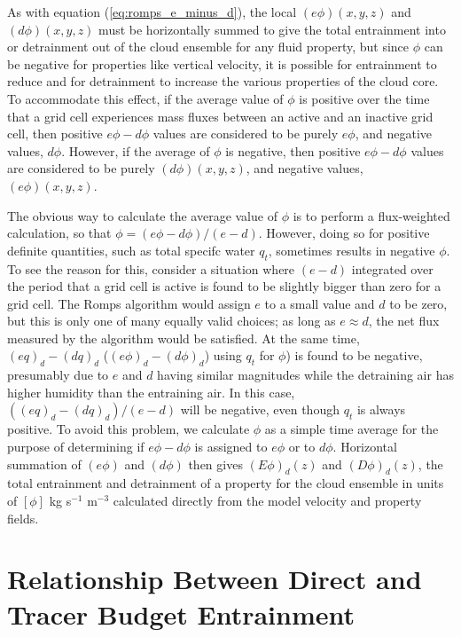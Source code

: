 \documentclass[12pt]{article}
\begin{document}
As with equation (\ref{eq:romps_e_minus_d}), the local $(e\phi)(x,y,z)$
and $(d\phi)(x,y,z)$ must be horizontally summed to give the total entrainment 
into or detrainment out of the cloud ensemble for any fluid property, but
since $\phi$ can be negative for properties like vertical velocity, it is 
possible for entrainment to reduce and for detrainment to increase the 
various properties of the cloud core.  To accommodate this effect, if the 
average value of $\phi$ is positive over the time that a grid cell experiences 
mass fluxes between an active and an inactive grid cell, then positive 
$e\phi-d\phi$ values are considered to be purely $e\phi$, and negative values, 
$d\phi$.  However, if the average of $\phi$ is negative, then positive 
$e\phi-d\phi$ values are considered to be purely $(d\phi)(x,y,z)$, and negative 
values, $(e\phi)(x,y,z)$.

The obvious way to calculate the average value of $\phi$ is to perform a 
flux-weighted calculation, so that $\phi = (e\phi - d\phi)/(e - d)$.  
However, doing so for positive definite quantities, such as total specifc 
water $q_t$, sometimes results in negative $\phi$.  To see the reason 
for this, consider a situation where $(e - d)$ integrated over the period 
that a grid cell is active is found to be slightly bigger than zero for 
a grid cell.  The Romps algorithm would assign $e$ to a small value and 
$d$ to be zero, but this is only one of many equally valid choices; as 
long as $e \approx d$, the net flux measured by the algorithm would be 
satisfied.  At the same time, $(e q)_d - (d q)_d$ 
($(e \phi)_d - (d \phi)_d$) using $q_t$ for $\phi$) is found to be 
negative, presumably due to $e$ and $d$ having similar magnitudes while 
the detraining air has higher humidity than the entraining air.  In this 
case, $((e q)_d - (d q)_d)/(e-d)$ will be negative, even though $q_t$ is 
always positive.  To avoid this problem, we calculate $\phi$ as a simple 
time average for the purpose of determining if $e\phi-d\phi$ is 
assigned to $e\phi$ or to $d\phi$.  Horizontal summation of $(e\phi)$ 
and $(d\phi)$ then gives $(E\phi)_d(z)$ and $(D\phi)_d(z)$, the total 
entrainment and detrainment of a property for the cloud ensemble in 
units of $[\phi]$ kg s$^{-1}$ m$^{-3}$ calculated directly from the 
model velocity and property fields.


\section{Relationship Between Direct and Tracer Budget Entrainment}
\end{document}
